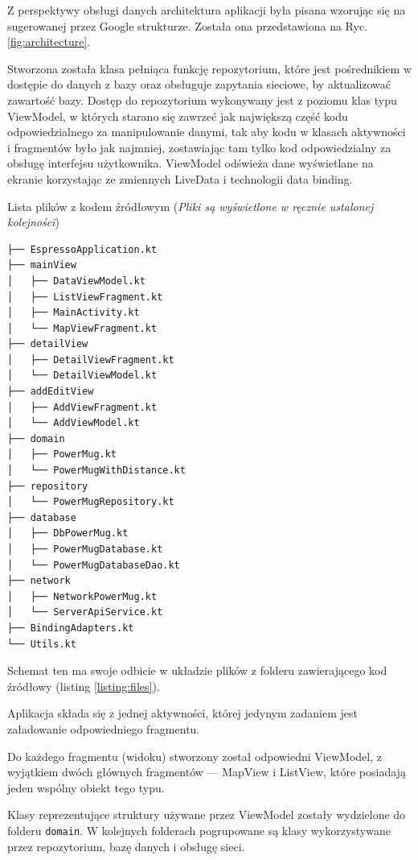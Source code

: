 \documentclass[polish,polish,a4paper,12pt]{article}
\begin{document}
		Z perspektywy obsługi danych architektura aplikacji była pisana wzorując się na sugerowanej przez Google strukturze. Została ona przedstawiona na Ryc. \ref{fig:architecture}.

		Stworzona została klasa pełniąca funkcję repozytorium, które jest pośrednikiem w dostępie do danych z bazy oraz obsługuje zapytania sieciowe, by aktualizować zawartość bazy. Dostęp do repozytorium wykonywany jest z poziomu klas typu ViewModel, w których starano się zawrzeć jak największą część kodu odpowiedzialnego za manipulowanie danymi, tak aby kodu w klasach aktywności i fragmentów było jak najmniej, zostawiając tam tylko kod odpowiedzialny za obsługę interfejsu użytkownika. ViewModel odświeża dane wyświetlane na ekranie korzystając ze zmiennych LiveData i technologii data binding.

		\begin{listing}[H]
			\caption{Lista plików z kodem źródłowym (\textit{Pliki są wyświetlone w ręcznie ustalonej kolejności})}
			\begin{verbatim}
├── EspressoApplication.kt
├── mainView
│   ├── DataViewModel.kt
│   ├── ListViewFragment.kt
│   ├── MainActivity.kt
│   └── MapViewFragment.kt
├── detailView
│   ├── DetailViewFragment.kt
│   └── DetailViewModel.kt
├── addEditView
│   ├── AddViewFragment.kt
│   └── AddViewModel.kt
├── domain
│   ├── PowerMug.kt
│   └── PowerMugWithDistance.kt
├── repository
│   └── PowerMugRepository.kt
├── database
│   ├── DbPowerMug.kt
│   ├── PowerMugDatabase.kt
│   └── PowerMugDatabaseDao.kt
├── network
│   ├── NetworkPowerMug.kt
│   └── ServerApiService.kt
├── BindingAdapters.kt
└── Utils.kt
			\end{verbatim}
			\label{listing:files}
		\end{listing}

		Schemat ten ma swoje odbicie w układzie plików z folderu zawierającego kod źródłowy (listing \ref{listing:files}).

		Aplikacja składa się z jednej aktywności, której jedynym zadaniem jest załadowanie odpowiedniego fragmentu.

		Do każdego fragmentu (widoku) stworzony został odpowiedni ViewModel, z wyjątkiem dwóch głównych fragmentów — MapView i ListView, które posiadają jeden wspólny obiekt tego typu.

		Klasy reprezentujące struktury używane przez ViewModel zostały wydzielone do folderu \texttt{domain}. W kolejnych folderach pogrupowane są klasy wykorzystywane przez repozytorium, bazę danych i obsługę sieci.
\end{document}
